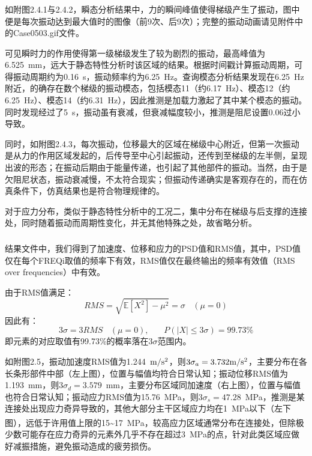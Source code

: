 \documentclass[12pt, oneside, a4paper]{ctexart}
\begin{document}
\subsubsection{}
\par{}
如附图2.4.1与2.4.2，瞬态分析结果中，力的瞬间峰值使得梯级产生了振动，图中便是每次振动达到最大值时的图像（前9次、后9次）；完整的振动动画请见附件中的Case0503.gif文件。
\par{}
可见瞬时力的作用使得第一级梯级发生了较为剧烈的振动，最高峰值为6.525~mm，远大于静态特性分析时该区域的结果。根据时间戳计算振动周期，可得振动周期约为0.16~s，振动频率约为6.25~Hz。查询模态分析结果发现在6.25~Hz附近，的确存在数个梯级的振动模态，包括模态11（约6.17~Hz）、模态12（约6.25~Hz）、模态14（约6.31~Hz），因此推测是加载力激起了其中某个模态的振动。同时发现经过了5~s，振动虽有衰减，但衰减幅度较小，推测是阻尼设置0.06过小导致。
\par{}
同时，如附图2.4.3，每次振动，位移最大的区域在梯级中心附近，但第一次振动是从力的作用区域发起的，后传导至中心引起振动，还传到至梯级的左半侧，呈现出波的形态；在振动后期由于能量传递，也引起了其他部件的振动。当然，由于是欠阻尼状态，振动衰减慢，不太符合现实；但振动传递确实是客观存在的，而在仿真条件下，仿真结果也是符合物理规律的。
\par{}
对于应力分布，类似于静态特性分析中的工况二，集中分布在梯级与后支撑的连接处，同时随着振动而周期性变化，并无其他特殊之处，故省略分析。
\subsubsection{}
\par{}
结果文件中，我们得到了加速度、位移和应力的PSD值和RMS值，其中，PSD值仅在每个FREQi取值的频率下有效，RMS值仅在最终输出的频率有效值（RMS over frequencies）中有效。
\par{}
由于RMS值满足：
\begin{equation*}
    RMS = \sqrt{\mathbb{E}[X^2] - \mu^2} = \sigma ~~~~(\mu = 0)
\end{equation*}
因此有：
\begin{equation*}
    3\sigma = 3RMS ~~~~(\mu = 0), ~~~~~~~~P(|X| \leq 3\sigma) = 99.73\%
\end{equation*}
即元素的对应取值有99.73\%的概率落在$3\sigma$范围内。
\par{}
如附图2.5，振动加速度RMS值为1.244~$\rm m/{s^2}$，则$3{\sigma}_a = 3.732 {\rm m/{s^2}}$，主要分布在各长条形部件中部（左上图），位置与幅值均符合日常认知；振动位移RMS值为1.193~mm，则$3{\sigma}_d = 3.579$~mm，主要分布区域同加速度（右上图），位置与幅值也符合日常认知；振动应力RMS值为15.76~MPa，则$3{\sigma}_s = 47.28$~MPa，推测是某连接处出现应力奇异导致的，其他大部分主干区域应力均在1~MPa以下（左下图），远低于许用值上限的15\textasciitilde17~MPa\textsuperscript{\textcolor{red}{\cite{ref2}}}，较高应力区域通常分布在连接处，但除极少数可能存在应力奇异的元素外几乎不存在超过3~MPa的点，针对此类区域应做好减振措施，避免振动造成的疲劳损伤。
\par{}
\end{document}
